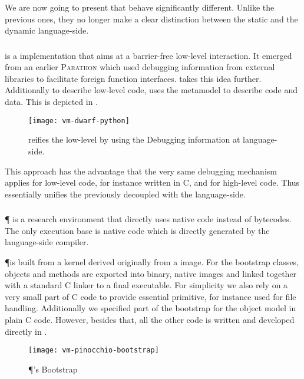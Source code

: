 We are now going to present \VMs that behave significantly different.
Unlike the previous ones, they no longer make a clear distinction between the static \VM and the dynamic language-side.


\subsubsection*{\DwarfPython}

\DwarfPython \cite{Kell11a} is a \Python implementation that aims at a barrier-free low-level interaction.
It emerged from an earlier \textsc{Parathon} which used \Dwarf debugging information from external libraries to facilitate foreign function interfaces.
\DwarfPython takes this idea further.
Additionally to describe low-level code, \DwarfPython uses the \Dwarf metamodel to describe \Python code and data.
This is depicted in .
%
\begin{figure}[h]
	\centering
	\texttt{[image: vm-dwarf-python]}
	\caption[\DwarfPython Low-level Reification]{\DwarfPython reifies the low-level \VM by using the \Dwarf Debugging information at language-side.}
\end{figure}
%
This approach has the advantage that the very same debugging mechanism applies for low-level code, for instance written in C, and for high-level \Python code.
Thus \DwarfPython essentially unifies the previously decoupled \VM with the language-side.

\subsubsection*{\Pinocchio \VM}

\P \cite{Verw11a} is a research \ST environment that directly uses native code instead of bytecodes.
The only execution base is native code which is directly generated by the language-side compiler.

\P is built from a kernel derived originally from a \PH image.
For the bootstrap classes, objects and methods are exported into binary, native images and linked together with a standard C linker to a final executable.
For simplicity we also rely on a very small part of C code to provide essential primitive, for instance used for file handling.
Additionally we specified part of the bootstrap for the \ST object model in plain C code.
However, besides that, all the other code is written and developed directly in \ST.
%
\begin{figure}[h]
	\centering
	\texttt{[image: vm-pinocchio-bootstrap]}
	\caption{\P's Bootstrap}
\end{figure}

